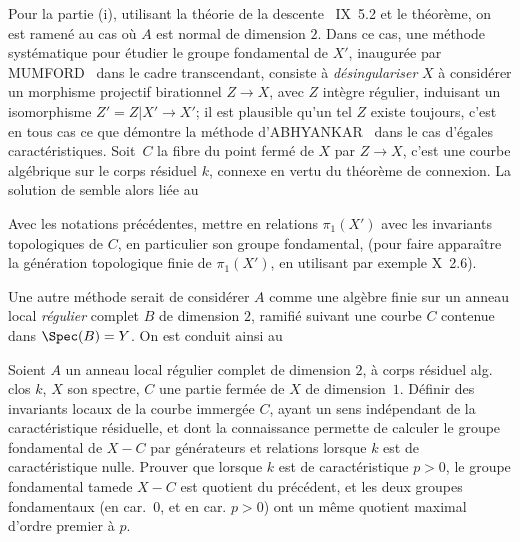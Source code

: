 Pour la partie (i), utilisant la th\'eorie de la descente ~IX~5.2 et le th\'eor\`eme, on est ramen\'e au cas o\`u $A$ est normal de dimension $2$. Dans ce cas, une m\'ethode syst\'ematique pour \'etudier le groupe fondamental de $X'$, inaugur\'ee par MUMFORD~\cite{XIII.5} dans le cadre transcendant, consiste \`a \emph{d\'esingulariser} $X$ \ie \`a consid\'erer un morphisme projectif birationnel $Z\to X$, avec $Z$ int\`egre r\'egulier, induisant un isomorphisme $Z'=Z|X'\to X'$; il est plausible qu'un tel $Z$ existe toujours, c'est en tous cas ce que d\'emontre la m\'ethode d'ABHYANKAR~\cite{XIII.1} dans le cas d'\og \'egales caract\'eristiques{\fg}. Soit~$C$ la fibre du point ferm\'e de $X$ par $Z\to X$, c'est une courbe alg\'ebrique sur le corps r\'esiduel $k$, connexe en vertu du th\'eor\`eme de connexion. La solution de  semble alors li\'ee au

\begin{probleme} \label{XIII.3.2}
Avec les notations pr\'ec\'edentes, mettre en relations $\pi_1(X')$ avec les invariants topologiques de $C$, en particulier son groupe fondamental, (pour faire appara\^itre la g\'en\'eration topologique finie de $\pi_1(X')$, en utilisant par exemple \SGA \textup{X~2.6}).
\end{probleme}

Une autre m\'ethode serait de consid\'erer $A$ comme une alg\`ebre finie sur un anneau local \emph{r\'egulier} complet $B$ de dimension $2$, ramifi\'e suivant une courbe $C$ contenue dans $\Spec(B)=Y$. On est conduit ainsi au

\begin{probleme} \label{XIII.3.3}
Soient $A$ un anneau local r\'egulier complet de dimension $2$, \`a corps r\'esiduel alg. clos $k$, $X$ son spectre, $C$ une partie ferm\'ee de $X$ de dimension~$1$. D\'efinir des invariants locaux de la courbe immerg\'ee $C$, ayant un sens ind\'ependant de la caract\'eristique r\'esiduelle, et dont la connaissance permette de calculer le groupe fondamental de $X-C$ par g\'en\'erateurs et relations lorsque $k$ est de caract\'eristique nulle. Prouver que lorsque $k$ est de caract\'eristique $p> 0$, le groupe fondamental \og tame\fg de $X-C$ est quotient du pr\'ec\'edent, et les deux groupes fondamentaux (en car.~$0$, et en car. $p> 0$) ont un m\^eme quotient maximal d'ordre premier \`a $p$.
\end{probleme}

